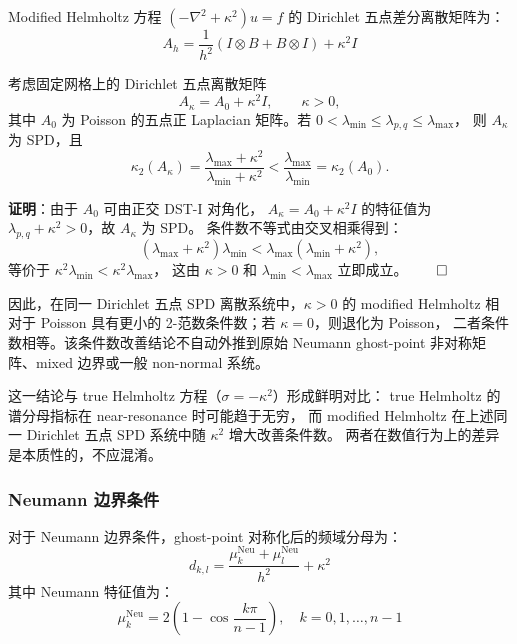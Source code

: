 Modified Helmholtz 方程 $(-\nabla^2+\kappa^2)u=f$ 的 Dirichlet 五点差分离散矩阵为：
\begin{equation}
  A_h = \frac{1}{h^2}(I \otimes B + B \otimes I) + \kappa^2 I
  \label{eq:modified_matrix}
\end{equation}

\begin{theorem}
  \label{thm:modified_spd}
  考虑固定网格上的 Dirichlet 五点离散矩阵
  \[
    A_\kappa=A_0+\kappa^2I,\qquad \kappa>0,
  \]
  其中 $A_0$ 为 Poisson 的五点正 Laplacian 矩阵。若
  $0<\lambda_{\min}\leq\lambda_{p,q}\leq\lambda_{\max}$，
  则 $A_\kappa$ 为 SPD，且
  \begin{equation}
    \kappa_2(A_\kappa)
    =
    \frac{\lambda_{\max}+\kappa^2}{\lambda_{\min}+\kappa^2}
    <
    \frac{\lambda_{\max}}{\lambda_{\min}}
    =
    \kappa_2(A_0).
    \label{eq:modified_condition}
  \end{equation}

  \textbf{证明}：由于 $A_0$ 可由正交 DST-I 对角化，
  $A_\kappa=A_0+\kappa^2I$ 的特征值为
  $\lambda_{p,q}+\kappa^2>0$，故 $A_\kappa$ 为 SPD。
  条件数不等式由交叉相乘得到：
  \[
    (\lambda_{\max}+\kappa^2)\lambda_{\min}
    <
    \lambda_{\max}(\lambda_{\min}+\kappa^2),
  \]
  等价于 $\kappa^2\lambda_{\min}<\kappa^2\lambda_{\max}$，
  这由 $\kappa>0$ 和 $\lambda_{\min}<\lambda_{\max}$ 立即成立。$\qed$
\end{theorem}

因此，在同一 Dirichlet 五点 SPD 离散系统中，$\kappa>0$ 的 modified Helmholtz
相对于 Poisson 具有更小的 2-范数条件数；若 $\kappa=0$，则退化为 Poisson，
二者条件数相等。该条件数改善结论不自动外推到原始 Neumann ghost-point
非对称矩阵、mixed 边界或一般 non-normal 系统。

\begin{remark}
  这一结论与 true Helmholtz 方程（$\sigma=-\kappa^2$）形成鲜明对比：
  true Helmholtz 的谱分母指标在 near-resonance 时可能趋于无穷，
  而 modified Helmholtz 在上述同一 Dirichlet 五点 SPD 系统中随 $\kappa^2$ 增大改善条件数。
  两者在数值行为上的差异是本质性的，不应混淆。
\end{remark}

\subsubsection{Neumann 边界条件}

对于 Neumann 边界条件，ghost-point 对称化后的频域分母为：
\begin{equation}
  d_{k,l} = \frac{\mu_k^{\mathrm{Neu}} + \mu_l^{\mathrm{Neu}}}{h^2} + \kappa^2
  \label{eq:modified_neumann_denom}
\end{equation}
其中 Neumann 特征值为：
\begin{equation}
  \mu_k^{\mathrm{Neu}} = 2\left(1 - \cos\frac{k\pi}{n-1}\right),
  \quad k = 0, 1, \ldots, n-1
\end{equation}

